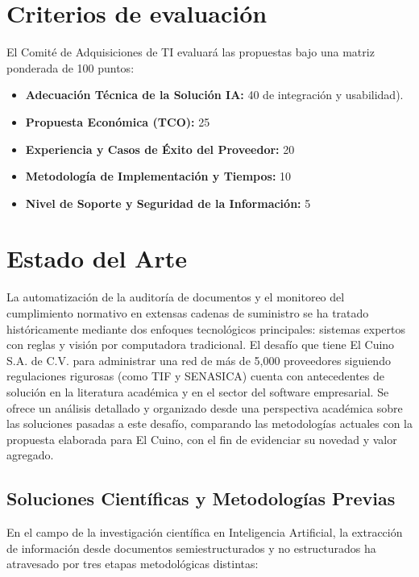 \documentclass[12pt]{article}
\begin{document}

\section{Criterios de evaluación}
El Comité de Adquisiciones de TI evaluará las propuestas bajo una matriz ponderada
de 100 puntos:
\begin{itemize}
    \item \textbf{Adecuación Técnica de la Solución IA:} 40%
    de integración y usabilidad).
    \item \textbf{Propuesta Económica (TCO):} 25%
    \item \textbf{Experiencia y Casos de Éxito del Proveedor:} 20%
    \item \textbf{Metodología de Implementación y Tiempos:} 10%
    \item \textbf{Nivel de Soporte y Seguridad de la Información:} 5%
\end{itemize}


\section{Estado del Arte}

La automatización de la auditoría de documentos y el monitoreo del cumplimiento normativo en
extensas cadenas de suministro se ha tratado históricamente mediante dos enfoques tecnológicos
principales: sistemas expertos con reglas y visión por computadora tradicional. El desafío que tiene El Cuino S.A. de C.V. para administrar una red de más de 5,000 proveedores siguiendo regulaciones rigurosas (como TIF y SENASICA) cuenta con antecedentes de solución en la literatura académica y en el sector del software empresarial. Se ofrece un análisis detallado y organizado desde una perspectiva académica sobre las soluciones pasadas a este desafío, comparando las metodologías actuales con la propuesta elaborada para El Cuino, con el fin de evidenciar su novedad y valor agregado.

\subsection{Soluciones Científicas y Metodologías Previas}

En el campo de la investigación científica en Inteligencia Artificial, la extracción de información desde documentos semiestructurados y no estructurados ha atravesado por tres etapas metodológicas distintas:
\end{document}
